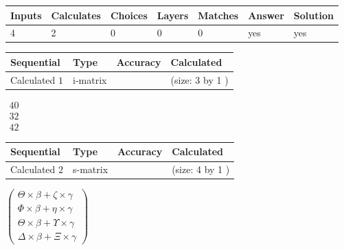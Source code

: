 \documentclass[12pt]{article}
\begin{document}
 
\noindent{}
 
 

 
 
\noindent{}
 
 

 
\vspace{0.3in}
   
   
   
   
\noindent\begin{tabular}{|l|l|l|l|l|l|l|}
 \hline
Inputs & Calculates & Choices & Layers & Matches & Answer & Solution \\ \hline
           4  & 
           2  & 
           0
  & 
           0  & 
           0  & 
  yes & 
  yes 
  \\ \hline
 \end{tabular}
   
   
   
   
\noindent{}
   
   
  
  
\noindent\begin{tabular}{|l|l|l|l|}
\hline
 Sequential & Type & Accuracy & Calculated \\ 
\hline
 
 
  Calculated $            1 $ & i-matrix &  & 
 (size:            3  by            1 )
 \\  \hline  
 \end{tabular}
   
   
$\begin{array}{
 c
 }
          40  \\ 
          32  \\ 
          42
 \end{array}  $ 
  
  
\noindent\begin{tabular}{|l|l|l|l|}
\hline
 Sequential & Type & Accuracy & Calculated \\ 
\hline
 
 
  Calculated $            2 $ & s-matrix & & 
 (size:            4  by            1 )
 \\  \hline  
 \end{tabular}
   
   
 $  \left( \begin{array}
 {
 c
 }
  \Theta \times  \beta +                     \zeta \times  \gamma \\ 
  \Phi \times  \beta +  \eta \times  \gamma \\ 
  \Theta \times  \beta +  \Upsilon \times  \gamma \\ 
  \Delta \times  \beta +                     \Xi \times  \gamma
 \end{array} \right) $ 
   
\end{document}
